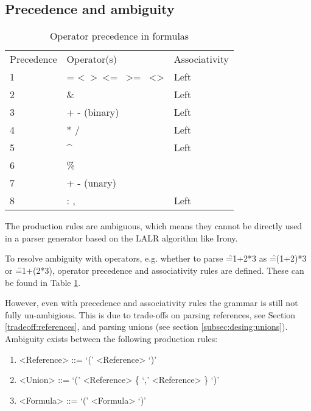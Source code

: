 \subsection{Precedence and ambiguity}
\label{sec:ambiguity}

\begin{table}
\small
\begin{tabular}{lll}
Precedence & Operator(s) & Associativity \\
1 & = \textless \  \textgreater \  \textless= \  \textgreater= \  \textless\textgreater & Left         \\
2 & \& & Left \\
3 & + - (binary) & Left \\
4 & $\ast$ / & Left \\
5 & \textasciicircum & Left\footnotemark \\
6 & \% & \\
7 & + - (unary) & \\
8 & : , \texttt{\char32} & Left
\end{tabular}
\caption{Operator precedence in formulas}
\label{table:operatorprec}
\end{table}


The production rules are ambiguous, which means they cannot be directly used in a parser generator based on the LALR algorithm like Irony.

To resolve ambiguity with operators, e.g. whether to parse \f{=1+2*3} as \f{=(1+2)*3} or \f{=1+(2*3)}, operator precedence and associativity rules are defined.
These can be found in Table \ref{table:operatorprec}.

However, even with precedence and associativity rules the grammar is still not fully un-ambigious.
This is due to trade-offs on parsing references, see Section \ref{tradeoff:references}, and parsing unions (see section \ref{subsec:desing:unions}).
Ambiguity exists between the following production rules:
\begin{enumerate}
	\item \begin{grammar}<Reference> ::= `(' <Reference> `)'\end{grammar}
	\item \begin{grammar}<Union> ::= `(' <Reference> \{ `,' <Reference> \} `)'\end{grammar}
	\item \begin{grammar}<Formula> ::= `(' <Formula> `)'\end{grammar}
\end{enumerate}

